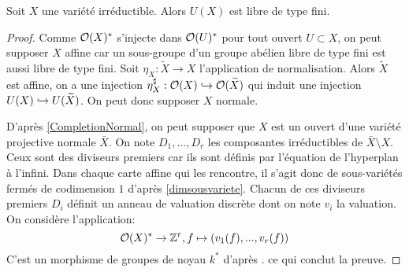 \begin{prop}
Soit $X$ une variété irréductible. Alors $U(X)$ est libre de type fini.
\end{prop}
\begin{proof}
Comme $\mathcal{O}(X)^*$ s'injecte dans $\mathcal{O}(U)^*$ pour tout ouvert $U\subset X$, on peut supposer $X$ affine car un sous-groupe d'un groupe abélien libre de type fini est aussi libre de type fini. Soit $\eta_X:\widetilde{X}\rightarrow X$ l'application de normalisation. Alors $\widetilde{X}$ est affine, on a une injection $\eta_X^\sharp:\mathcal{O}(X)\xhookrightarrow{}\mathcal{O}(\widetilde{X})$ qui induit une injection $U(X)\xhookrightarrow{}U(\widetilde{X})$. On peut donc supposer $X$ normale.

D'après \ref{CompletionNormal}, on peut supposer que $X$ est un ouvert d'une variété projective normale $\bar{X}$. On note $D_1,...,D_r$ les composantes irréductibles de $\bar{X}\setminus X$. Ceux sont des diviseurs premiers car ils sont définis par l'équation de l'hyperplan à l'infini. Dans chaque carte affine qui les rencontre, il s'agit donc de sous-variétés fermés de codimension $1$ d'après \ref{dimsousvariete}. Chacun de ces diviseurs premiers $D_i$ définit un anneau de valuation discrète dont on note $v_i$ la valuation. On considère l'application:
$$\mathcal{O}(X)^*\rightarrow \mathbb{Z}^r, f\mapsto (v_1(f),...,v_r(f))$$
C'est un morphisme de groupes de noyau $k^*$ d'après \cite[I.3.4]{Hartshorne}. ce qui conclut la preuve.
\end{proof}

